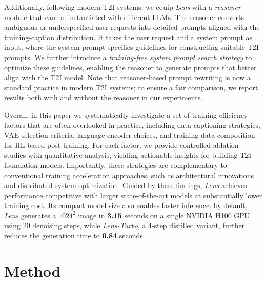 \documentclass{llmxive}
\begin{document}
Additionally, following modern T2I systems, we equip \textit{Lens} with a \textit{reasoner} module that can be instantiated with different LLMs. The reasoner converts ambiguous or underspecified user requests into detailed prompts aligned with the training-caption distribution. It takes the user request and a system prompt as input, where the system prompt specifies guidelines for constructing suitable T2I prompts. We further introduce a \textit{training-free system prompt search strategy} to optimize these guidelines, enabling the reasoner to generate prompts that better align with the T2I model. Note that reasoner-based prompt rewriting is now a standard practice in modern T2I systems; to ensure a fair comparison, we report results both with and without the reasoner in our experiments.

Overall, in this paper we systematically investigate a set of training efficiency factors that are often overlooked in practice, including data captioning strategies, VAE selection criteria, language encoder choices, and training-data composition for RL-based post-training. For each factor, we provide controlled ablation studies with quantitative analysis, yielding actionable insights for building T2I foundation models. Importantly, these strategies are complementary to conventional training acceleration approaches, such as architectural innovations and distributed-system optimization. Guided by these findings, \textit{Lens} achieves performance competitive with larger state-of-the-art models at substantially lower training cost. Its compact model size also enables faster inference: by default, \textit{Lens} generates a $1024^2$ image in \textbf{3.15} seconds on a single NVIDIA H100 GPU using 20 denoising steps, while \textit{Lens-Turbo}, a 4-step distilled variant, further reduces the generation time to \textbf{0.84} seconds.


\section{Method}
\end{document}
